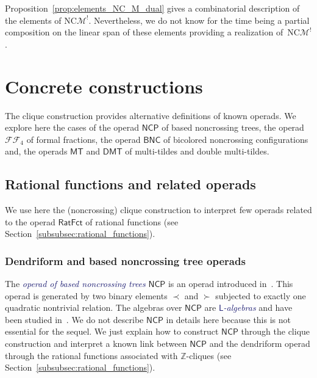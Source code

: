 \documentclass[10pt,reqno]{amsart}
\numberwithin{equation}{subsection}
\newcommand{\Z}{\mathbb{Z}}
\newcommand{\Mca}{\mathcal{M}}
\newcommand{\BNC}{\mathsf{BNC}}
\newcommand{\RatFct}{\mathsf{RatFct}}
\newcommand{\NCP}{\mathsf{NCP}}
\newcommand{\LOp}{\mathsf{L}}
\newcommand{\MT}{\mathsf{MT}}
\newcommand{\DMT}{\mathsf{DMT}}
\newcommand{\NC}{\mathrm{NC}}
\newcommand{\FF}{\mathcal{F}\mathcal{F}}
\newcommand{\GDendr}{\prec}
\newcommand{\DDendr}{\succ}
\newcommand{\Def}[1]{\textcolor{MidnightBlue}{\em #1}}
\begin{document}
Proposition~\ref{prop:elements_NC_M_dual} gives a combinatorial
description of the elements of $\NC\Mca^!$. Nevertheless, we do not know
for the time being a partial composition on the linear span of these
elements providing a realization of~$\NC\Mca^!$.
\medskip

\section{Concrete constructions}%
\label{sec:concrete_constructions}
The clique construction provides alternative definitions of known
operads. We explore here the cases of the operad $\NCP$ of based
noncrossing trees, the operad $\FF_4$ of formal fractions, the operad
$\BNC$ of bicolored noncrossing configurations and, the operads $\MT$
and $\DMT$ of multi-tildes and double multi-tildes.
\medskip

\subsection{Rational functions and related operads}
We use here the (noncrossing) clique construction to interpret few
operads related to the operad $\RatFct$ of rational functions (see
Section~\ref{subsubsec:rational_functions}).
\medskip

\subsubsection{Dendriform and based noncrossing tree operads}
The \Def{operad of based noncrossing trees} $\NCP$ is an operad
introduced in~\cite{Cha07}. This operad is generated by two binary
elements $\GDendr$ and $\DDendr$ subjected to exactly one quadratic
nontrivial relation. The algebras over $\NCP$ are
\Def{$\LOp$-algebras} and have been studied in~\cite{Ler11}.
We do not describe $\NCP$ in details here because this is not essential
for the sequel. We just explain how to construct $\NCP$ through the
clique construction and interpret a known link between $\NCP$ and the
dendriform operad through the rational functions associated with
$\Z$-cliques (see Section~\ref{subsubsec:rational_functions}).
\medskip
\end{document}
